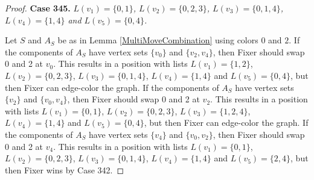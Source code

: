 \documentclass[12pt]{amsart}
\theoremstyle{plain}
\theoremstyle{definition}
\theoremstyle{remark}
\begin{document}
\begin{proof}
\noindent\textbf{Case 345.  }\textit{$L(v_1) = \{0, 1\}$, $L(v_2) = \{0, 2, 3\}$, $L(v_3) = \{0, 1, 4\}$, $L(v_4) = \{1, 4\}$ and $L(v_5) = \{0, 4\}$.}

Let $S$ and $A_S$ be as in Lemma \ref{MultiMoveCombination} using colors $0$ and $2$. If the components of $A_S$ have vertex sets $\{v_0\}$ and $\{v_2, v_4\}$, then Fixer should swap 0 and 2 at $v_0$. This results in a position with lists $L(v_1) = \{1, 2\}$, $L(v_2) = \{0, 2, 3\}$, $L(v_3) = \{0, 1, 4\}$, $L(v_4) = \{1, 4\}$ and $L(v_5) = \{0, 4\}$, but then Fixer can edge-color the graph. If the components of $A_S$ have vertex sets $\{v_2\}$ and $\{v_0, v_4\}$, then Fixer should swap 0 and 2 at $v_2$. This results in a position with lists $L(v_1) = \{0, 1\}$, $L(v_2) = \{0, 2, 3\}$, $L(v_3) = \{1, 2, 4\}$, $L(v_4) = \{1, 4\}$ and $L(v_5) = \{0, 4\}$, but then Fixer can edge-color the graph. If the components of $A_S$ have vertex sets $\{v_4\}$ and $\{v_0, v_2\}$, then Fixer should swap 0 and 2 at $v_4$. This results in a position with lists $L(v_1) = \{0, 1\}$, $L(v_2) = \{0, 2, 3\}$, $L(v_3) = \{0, 1, 4\}$, $L(v_4) = \{1, 4\}$ and $L(v_5) = \{2, 4\}$, but then Fixer wins by Case 342. 

\end{proof}
\end{document}
